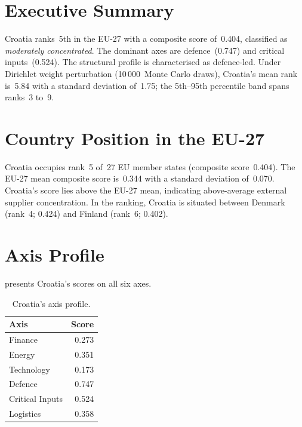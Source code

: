 \documentclass[12pt,a4paper]{article}
\begin{document}
\hypersetup{pageanchor=true}
\pagestyle{fancy}
\renewcommand{\headrulewidth}{0.4pt}


\section{Executive Summary}
\label{sec:summary}

Croatia ranks~5th in the EU-27 with a composite \ISI score of~0.404, classified as \emph{moderately concentrated}.  The dominant axes are defence~(0.747) and critical inputs~(0.524).  The structural profile is characterised as defence-led.  Under Dirichlet weight perturbation (10\,000~Monte Carlo draws), Croatia's mean rank is~5.84 with a standard deviation of~1.75; the 5th--95th percentile band spans ranks~3 to~9.


\section{Country Position in the EU-27}
\label{sec:position}

Croatia occupies rank~5 of~27 EU member states (composite score~0.404).  The EU-27 mean composite score is~0.344 with a standard deviation of~0.070.  Croatia's score lies above the EU-27 mean, indicating above-average external supplier concentration.  In the ranking, Croatia is situated between Denmark (rank~4; 0.424) and Finland (rank~6; 0.402).


\section{Axis Profile}
\label{sec:axis-profile}

 presents Croatia's scores on all six \ISI axes.

\begin{table}[htbp]
\centering\small
\caption{Croatia's \ISI axis profile.}
\label{tab:axis-profile}
\begin{tabular}{@{}lr@{}}
\toprule
\textbf{Axis} & \textbf{Score} \\
\midrule
    Finance           & 0.273 \\
    Energy            & 0.351 \\
    Technology        & 0.173 \\
    Defence           & 0.747 \\
    Critical Inputs   & 0.524 \\
    Logistics         & 0.358 \\
\bottomrule
\end{tabular}
\end{table}
\end{document}
